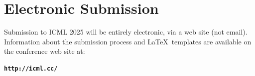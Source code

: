 \documentclass{article}
\theoremstyle{plain}
\theoremstyle{definition}
\theoremstyle{remark}
\begin{document}

\newpage
\section{Electronic Submission}
\label{submission}

Submission to ICML 2025 will be entirely electronic, via a web site
(not email). Information about the submission process and \LaTeX\ templates
are available on the conference web site at:
\begin{center}
\textbf{\texttt{http://icml.cc/}}
\end{center}
\end{document}
